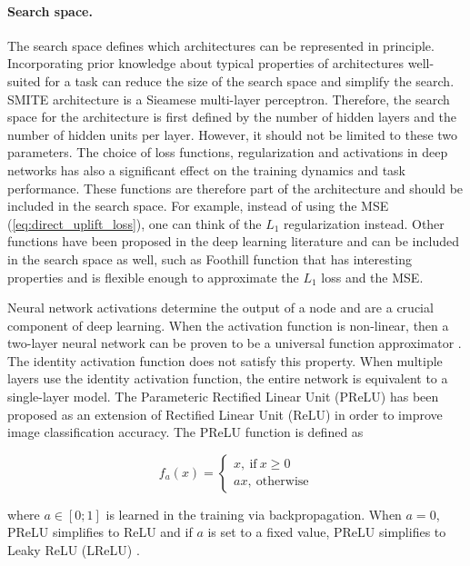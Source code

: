 \documentclass{article}
\begin{document}
\paragraph{Search space.}

The search space defines which architectures can be represented
in principle. Incorporating prior knowledge about typical properties of architectures well-suited for a task can reduce the size of the search space and simplify the search. SMITE architecture is a Sieamese multi-layer perceptron. Therefore, the search space for the architecture is first defined by the number of hidden layers and the number of hidden units per layer. However, it should not be limited to these two parameters. The choice of loss functions, regularization and activations in deep networks has also a significant effect on the training dynamics and task performance. These functions are therefore part of the architecture and should be included in the search space. For example, instead of using the MSE (\ref{eq:direct_uplift_loss}), one can think of the $L_1$ regularization instead. Other functions have been proposed in the deep learning literature and can be included in the search space as well, such as Foothill function  \citep{belbahri2019foothill} that has interesting properties and is flexible enough to approximate the $L_1$ loss and the MSE.

Neural network activations determine the output of a node and are a crucial component of deep learning. When the activation function is non-linear, then a two-layer neural network can be proven to be a universal function approximator \citep{cybenko1989approximation}. The identity activation function does not satisfy this property. When multiple layers use the identity activation function, the entire network is equivalent to a single-layer model. The Parameteric Rectified Linear Unit (PReLU) \citep{he2015delving} has been proposed as an extension of Rectified Linear Unit (ReLU) \citep{nair2010rectified} in order to improve image classification accuracy. The PReLU function is defined as

\[
f_a (x) = 
\begin{cases}
    x, ~\mathrm{if}~ x \geq 0\\
    ax, ~\mathrm{otherwise}
\end{cases}
\]

where $a \in [0;1]$ is learned in the training via backpropagation. When $a=0$, PReLU simplifies to ReLU and if $a$ is set to a fixed value, PReLU simplifies to Leaky ReLU (LReLU)  \citep{maas2013rectifier}.
\end{document}
